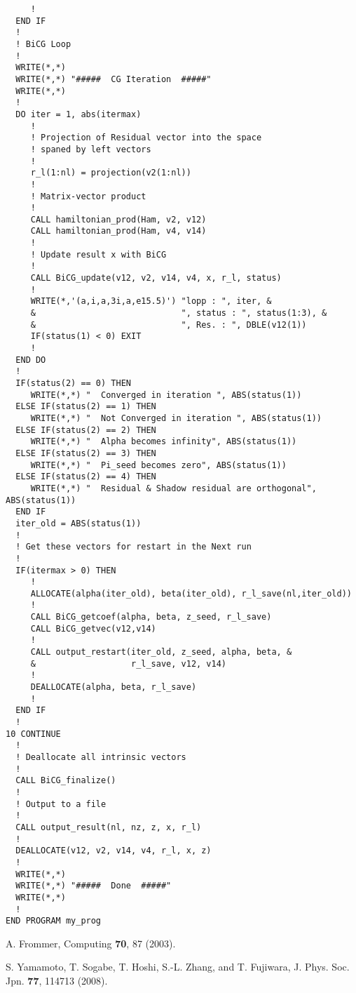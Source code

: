 \documentclass[12pt,titlepage]{jarticle}
\begin{document}
\begin{lstlisting}
     !
  END IF
  !
  ! BiCG Loop
  !
  WRITE(*,*)
  WRITE(*,*) "#####  CG Iteration  #####"
  WRITE(*,*)
  !
  DO iter = 1, abs(itermax)
     !
     ! Projection of Residual vector into the space
     ! spaned by left vectors
     !
     r_l(1:nl) = projection(v2(1:nl))
     !
     ! Matrix-vector product
     !
     CALL hamiltonian_prod(Ham, v2, v12)
     CALL hamiltonian_prod(Ham, v4, v14)
     !
     ! Update result x with BiCG
     !
     CALL BiCG_update(v12, v2, v14, v4, x, r_l, status)
     !
     WRITE(*,'(a,i,a,3i,a,e15.5)') "lopp : ", iter, &
     &                             ", status : ", status(1:3), &
     &                             ", Res. : ", DBLE(v12(1))
     IF(status(1) < 0) EXIT
     !
  END DO
  !
  IF(status(2) == 0) THEN
     WRITE(*,*) "  Converged in iteration ", ABS(status(1))
  ELSE IF(status(2) == 1) THEN
     WRITE(*,*) "  Not Converged in iteration ", ABS(status(1))
  ELSE IF(status(2) == 2) THEN
     WRITE(*,*) "  Alpha becomes infinity", ABS(status(1))
  ELSE IF(status(2) == 3) THEN
     WRITE(*,*) "  Pi_seed becomes zero", ABS(status(1))
  ELSE IF(status(2) == 4) THEN
     WRITE(*,*) "  Residual & Shadow residual are orthogonal", ABS(status(1))
  END IF
  iter_old = ABS(status(1))
  !
  ! Get these vectors for restart in the Next run
  !
  IF(itermax > 0) THEN
     !
     ALLOCATE(alpha(iter_old), beta(iter_old), r_l_save(nl,iter_old))
     !
     CALL BiCG_getcoef(alpha, beta, z_seed, r_l_save)
     CALL BiCG_getvec(v12,v14)
     !
     CALL output_restart(iter_old, z_seed, alpha, beta, &
     &                   r_l_save, v12, v14)
     !
     DEALLOCATE(alpha, beta, r_l_save)
     !     
  END IF
  !
10 CONTINUE
  !
  ! Deallocate all intrinsic vectors
  !
  CALL BiCG_finalize()
  !
  ! Output to a file
  !
  CALL output_result(nl, nz, z, x, r_l)
  !
  DEALLOCATE(v12, v2, v14, v4, r_l, x, z)
  !
  WRITE(*,*)
  WRITE(*,*) "#####  Done  #####"
  WRITE(*,*)
  !
END PROGRAM my_prog
\end{lstlisting}


\begin{thebibliography}{99}
  A. Frommer, Computing {\bf 70}, 87 (2003).
  
  S. Yamamoto, T. Sogabe, T. Hoshi, S.-L. Zhang, and T. Fujiwara, J. Phys. Soc. Jpn. {\bf 77}, 114713 (2008).
\end{thebibliography}
\end{document}
